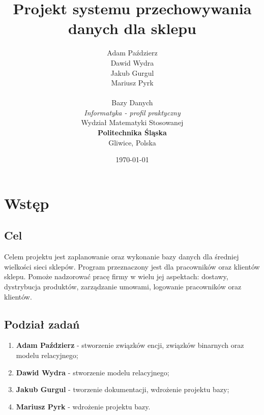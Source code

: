 \documentclass[12pt,a4paper]{article}
\begin{document}
    \pagestyle{fancy}

    \title{
    \vspace*{3cm}
    \textbf{Projekt systemu przechowywania danych dla sklepu}}
    \author{Adam Paździerz\\ Dawid Wydra\\ Jakub Gurgul\\ Mariusz Pyrk\\ 
            \vspace*{0.5cm} \\      
            Bazy Danych\\
            \textit{Informatyka - profil praktyczny}\\
            Wydział Matematyki Stosowanej\\
            \textbf{Politechnika Śląska}\\
            Gliwice, Polska
    }
    \date{\today}
	
	\maketitle
	\newpage

    \tableofcontents
    \thispagestyle{empty}
    \newpage

	\section{Wstęp}

        \subsection{Cel}
            Celem projektu jest zaplanowanie oraz wykonanie bazy danych dla średniej wielkości sieci sklepów. Program przeznaczony jest dla pracowników oraz klientów sklepu. Pomoże nadzorować pracę firmy w wielu jej aspektach: dostawy, dystrybucja produktów, zarządzanie umowami, logowanie pracowników oraz klientów.
            
        \subsection{Podział zadań}
            \begin{enumerate}
                \item \textbf{Adam Paździerz} - stworzenie związków encji, związków binarnych oraz modelu relacyjnego;
                \item \textbf{Dawid Wydra} - stworzenie modelu relacyjnego;
                \item \textbf{Jakub Gurgul} - tworzenie dokumentacji, wdrożenie projektu bazy;
                \item \textbf{Mariusz Pyrk} - wdrożenie projektu bazy.
            \end{enumerate}
\end{document}
